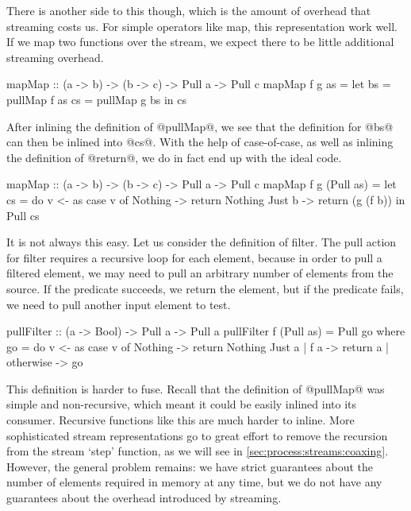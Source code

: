 There is another side to this though, which is the amount of overhead that streaming costs us.
For simple operators like map, this representation work well. If we map two functions over the stream, we expect there to be little additional streaming overhead.

\begin{code}
mapMap :: (a -> b) -> (b -> c) -> Pull a -> Pull c
mapMap f g as 
 = let bs = pullMap f as
       cs = pullMap g bs
   in  cs
\end{code}

After inlining the definition of @pullMap@, we see that the definition for @bs@ can then be inlined into @cs@.
With the help of case-of-case, as well as inlining the definition of @return@, we do in fact end up with the ideal code.

\begin{code}
mapMap :: (a -> b) -> (b -> c) -> Pull a -> Pull c
mapMap f g (Pull as)
 = let cs = do
          v <- as
          case v of
           Nothing -> return Nothing
           Just b  -> return (g (f b))
   in Pull cs
\end{code}

It is not always this easy.
Let us consider the definition of filter.
The pull action for filter requires a recursive loop for each element, because in order to pull a filtered element, we may need to pull an arbitrary number of elements from the source.
If the predicate succeeds, we return the element, but if the predicate fails, we need to pull another input element to test.

\begin{code}
pullFilter :: (a -> Bool) -> Pull a -> Pull a
pullFilter f (Pull as) = Pull go
 where
  go = do
    v <- as
    case v of
     Nothing -> return Nothing
     Just a  | f a
             -> return a
             | otherwise
             -> go
\end{code}

This definition is harder to fuse. Recall that the definition of @pullMap@ was simple and non-recursive, which meant it could be easily inlined into its consumer.
Recursive functions like this are much harder to inline.
More sophisticated stream representations go to great effort to remove the recursion from the stream `step' function, as we will see in \autoref{sec:process:streams:coaxing}.
However, the general problem remains: we have strict guarantees about the number of elements required in memory at any time, but we do not have any guarantees about the overhead introduced by streaming.


